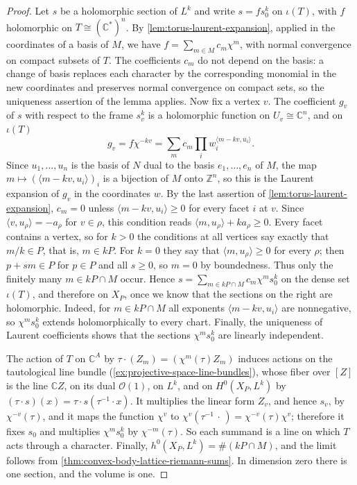 \begin{proof}
Let $s$ be a holomorphic section of $L^k$ and write $s=fs_0^k$ on $\iota(T)$, with $f$ holomorphic on $T\cong(\mathbb C^*)^n$. By \cref{lem:torus-laurent-expansion}, applied in the coordinates of a basis of $M$, we have $f=\sum_{m\in M}c_m\chi^m$, with normal convergence on compact subsets of $T$. The coefficients $c_m$ do not depend on the basis: a change of basis replaces each character by the corresponding monomial in the new coordinates and preserves normal convergence on compact sets, so the uniqueness assertion of the lemma applies. Now fix a vertex $v$. The coefficient $g_v$ of $s$ with respect to the frame $s_v^k$ is a holomorphic function on $U_v\cong\mathbb C^n$, and on $\iota(T)$
\[
 g_v=f\chi^{-kv}=\sum_mc_m\prod_iw_i^{\langle m-kv,u_i\rangle}.
\]
Since $u_1,\ldots,u_n$ is the basis of $N$ dual to the basis $e_1,\ldots,e_n$ of $M$, the map $m\mapsto(\langle m-kv,u_i\rangle)_i$ is a bijection of $M$ onto $\mathbb Z^n$, so this is the Laurent expansion of $g_v$ in the coordinates $w$. By the last assertion of \cref{lem:torus-laurent-expansion}, $c_m=0$ unless $\langle m-kv,u_i\rangle\geq0$ for every facet $i$ at $v$. Since $\langle v,u_\rho\rangle=-a_\rho$ for $v\in\rho$, this condition reads $\langle m,u_\rho\rangle+ka_\rho\geq0$. Every facet contains a vertex, so for $k>0$ the conditions at all vertices say exactly that $m/k\in P$, that is, $m\in kP$. For $k=0$ they say that $\langle m,u_\rho\rangle\geq0$ for every $\rho$; then $p+sm\in P$ for $p\in P$ and all $s\geq0$, so $m=0$ by boundedness. Thus only the finitely many $m\in kP\cap M$ occur. Hence $s=\sum_{m\in kP\cap M}c_m\chi^ms_0^k$ on the dense set $\iota(T)$, and therefore on $X_P$, once we know that the sections on the right are holomorphic. Indeed, for $m\in kP\cap M$ all exponents $\langle m-kv,u_i\rangle$ are nonnegative, so $\chi^ms_0^k$ extends holomorphically to every chart. Finally, the uniqueness of Laurent coefficients shows that the sections $\chi^ms_0^k$ are linearly independent.

The action of $T$ on $\mathbb C^A$ by $\tau\cdot(Z_m)=(\chi^m(\tau)Z_m)$ induces actions on the tautological line bundle (\cref{ex:projective-space-line-bundles}), whose fiber over $[Z]$ is the line $\mathbb CZ$, on its dual $\mathcal O(1)$, on $L^k$, and on $H^0(X_P,L^k)$ by $(\tau\cdot s)(x)=\tau\cdot s(\tau^{-1}\cdot x)$. It multiplies the linear form $Z_v$, and hence $s_v$, by $\chi^{-v}(\tau)$, and it maps the function $\chi^v$ to $\chi^v(\tau^{-1}\,\cdot\,)=\chi^{-v}(\tau)\chi^v$; therefore it fixes $s_0$ and multiplies $\chi^ms_0^k$ by $\chi^{-m}(\tau)$. So each summand is a line on which $T$ acts through a character. Finally, $h^0(X_P,L^k)=\#(kP\cap M)$, and the limit follows from \cref{thm:convex-body-lattice-riemann-sums}. In dimension zero there is one section, and the volume is one.
\end{proof}


